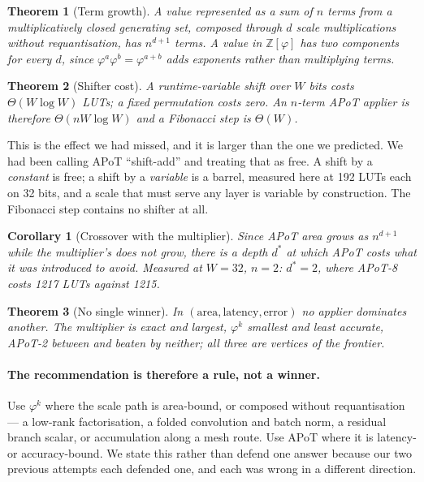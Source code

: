 \documentclass[11pt]{article}
\newtheorem{theorem}{Theorem}
\newtheorem{corollary}{Corollary}
\theoremstyle{definition}
\begin{document}
\begin{theorem}[Term growth]
\label{thm:termgrowth}
A value represented as a sum of $n$ terms from a multiplicatively closed
generating set, composed through $d$ scale multiplications without
requantisation, has $n^{d+1}$ terms. A value in $\mathbb{Z}[\varphi]$ has two
components for every $d$, since $\varphi^{a}\varphi^{b} = \varphi^{a+b}$ adds
exponents rather than multiplying terms.
\end{theorem}

\begin{theorem}[Shifter cost]
\label{thm:shifter}
A runtime-variable shift over $W$ bits costs $\Theta(W\log W)$ LUTs; a fixed
permutation costs zero. An $n$-term APoT applier is therefore
$\Theta(nW\log W)$ and a Fibonacci step is $\Theta(W)$.
\end{theorem}

This is the effect we had missed, and it is larger than the one we predicted. We
had been calling APoT ``shift-add'' and treating that as free. A shift by a
\emph{constant} is free; a shift by a \emph{variable} is a barrel, measured here
at 192 LUTs each on 32 bits, and a scale that must serve any layer is variable by
construction. The Fibonacci step contains no shifter at all.

\begin{corollary}[Crossover with the multiplier]
\label{cor:crossover}
Since APoT area grows as $n^{d+1}$ while the multiplier's does not grow, there is
a depth $d^{*}$ at which APoT costs what it was introduced to avoid. Measured at
$W=32$, $n=2$: $d^{*}=2$, where APoT-8 costs 1217 LUTs against 1215.
\end{corollary}

\begin{theorem}[No single winner]
\label{thm:threevertex}
In $(\text{area}, \text{latency}, \text{error})$ no applier dominates another.
The multiplier is exact and largest, $\varphi^{k}$ smallest and least accurate,
APoT-2 between and beaten by neither; all three are vertices of the frontier.
\end{theorem}

\paragraph{The recommendation is therefore a rule, not a winner.} Use
$\varphi^{k}$ where the scale path is area-bound, or composed without
requantisation --- a low-rank factorisation, a folded convolution and batch norm,
a residual branch scalar, or accumulation along a mesh route. Use APoT where it is
latency- or accuracy-bound. We state this rather than defend one answer because
our two previous attempts each defended one, and each was wrong in a different
direction.
\end{document}
